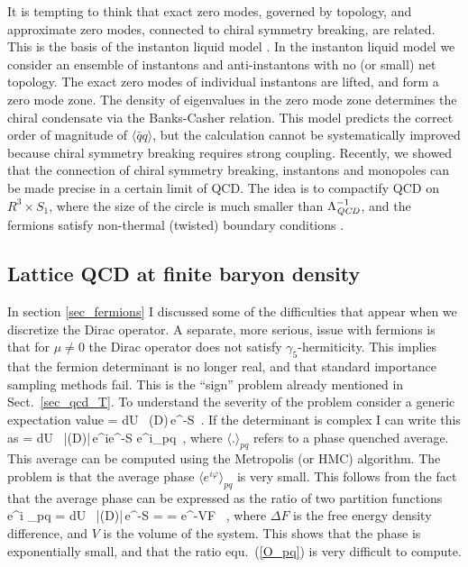  It is tempting to think that exact zero modes, governed by topology, 
and approximate zero modes, connected to chiral symmetry breaking,
are related. This is the basis of the instanton liquid model
\cite{Schafer:1996wv}. In the instanton liquid model we consider an 
ensemble of instantons and anti-instantons with no (or small) net 
topology. The exact zero modes of individual instantons are lifted, 
and form a zero mode zone. The density of eigenvalues in the zero 
mode zone determines the chiral condensate via the Banks-Casher relation. 
This model predicts the correct order of magnitude of $\langle\bar{q}q
\rangle$, but the calculation cannot be systematically improved
because chiral symmetry breaking requires strong coupling. Recently,
we showed that the connection of chiral symmetry breaking, instantons
and monopoles can be made precise in a certain limit of QCD. The
idea is to compactify QCD on $R^3\times S_1$, where the size of the 
circle is much smaller than $\Lambda^{-1}_{\it QCD}$, and the fermions 
satisfy non-thermal (twisted) boundary conditions \cite{Cherman:2016hcd}.

\subsection{Lattice QCD at finite baryon density}
\label{sec_lQCD_mu}
 
 In section \ref{sec_fermions} I discussed some of the difficulties 
that appear when we discretize the Dirac operator.  A separate, more 
serious, issue with fermions is that for $\mu\neq 0$ the Dirac
operator does not satisfy $\gamma_5$-hermiticity. This implies that  
the fermion determinant is no longer real, and that standard importance 
sampling methods fail. This is the ``sign'' problem already mentioned in 
Sect.~\ref{sec_qcd_T}. To understand the severity of the problem 
consider a generic expectation value 
\be
{} \rangle = 
       {\int dU \, \det(D)\,e^{-S}}\, . 
\ee
If the determinant is complex I can write this as
\be
\label{O_pq}
 \rangle = 
       {\int dU \, |\det(D)|\,e^{i\varphi}e^{-S}}
 \equiv {}
             {\langle e^{i\varphi}\rangle_{pq}}\, , 
\ee
where $\langle .\rangle_{pq}$ refers to a phase quenched average. This
average can be computed using the Metropolis (or HMC) algorithm. The 
problem is that the average phase $\langle e^{i\varphi}\rangle_{pq}$ is
very small. This follows from the fact that the average phase can
be expressed as the ratio of two partition functions
\be
\label{ph_av}
\langle e^{i\varphi} \rangle_{pq} = 
       {\int dU \, |\det(D)|\,e^{-S}}
 =  = e^{-V\Delta F} \, , 
\ee
where $\Delta F$ is the free energy density difference, and $V$ is the 
volume of the system. This shows that the phase is exponentially small, 
and that the ratio equ.~(\ref{O_pq}) is very difficult to compute. 

